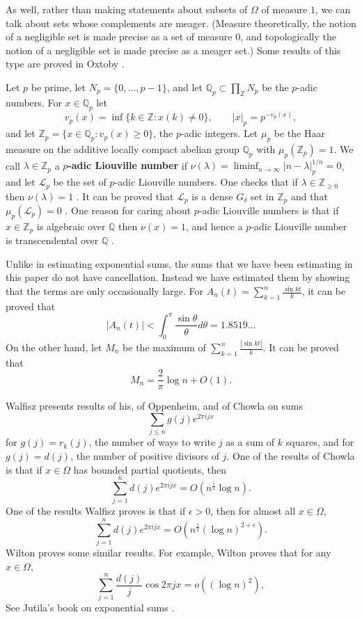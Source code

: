 \documentclass{amsart}
\begin{document}
As well, rather than making statements about subsets of $\Omega$ of measure $1$, we can talk about sets whose complements are meager. (Measure theoretically,
the notion of a negligible set is made precise as a set of measure $0$, and topologically the notion of a negligible set is made precise as a meager set.)
Some results of this type are proved in Oxtoby \cite[Chapter 2]{oxtoby}.

Let $p$ be prime, let $N_p=\{0,\ldots,p-1\}$, and let $\mathbb{Q}_p \subset \prod_{\mathbb{Z}} N_p$ be the $p$-adic numbers. For $x \in \mathbb{Q}_p$
let
\[
v_p(x) = \inf\{k \in \mathbb{Z}: x(k) \neq 0\},\qquad |x|_p = p^{-v_p(x)},
\]
and let $\mathbb{Z}_p = \{x \in \mathbb{Q}_p: v_p(x) \geq 0\}$, the $p$-adic integers. 
Let $\mu_p$ be the Haar measure on the additive locally compact abelian group $\mathbb{Q}_p$ with
$\mu_p(\mathbb{Z}_p)=1$. 
We call $\lambda \in \mathbb{Z}_p$ a \textbf{$p$-adic Liouville number} if $\nu(\lambda)=\liminf_{n \to \infty} |n-\lambda|_p^{1/n}=0$, and let
$\mathscr{L}_p$ be the set of $p$-adic Liouville numbers. One checks that if $\lambda \in \mathbb{Z}_{\geq 0}$ then
$\nu(\lambda)=1$  \cite[p.~201, Exercise 66.A]{schikhof}.
It can be proved that $\mathscr{L}_p$ is a dense $G_\delta$ set in $\mathbb{Z}_p$ \cite[p.~204,
Theorem 67.3]{schikhof} and that
$\mu_p(\mathscr{L}_p)=0$ \cite[p.~205, Theorem 67.4]{schikhof}.
One reason for caring about $p$-adic Liouville numbers is that
if $x \in \mathbb{Z}_p$ is algebraic over $\mathbb{Q}$ then $\nu(x)=1$, and hence
a $p$-adic Liouville number is transcendental over $\mathbb{Q}$ \cite[p.~203, Theorem 67.2]{schikhof}.



Unlike in estimating exponential sums, the sums that we have been estimating
in this paper do not have cancellation. Instead we have estimated
them by showing that the terms are only occasionally large. 
For $A_n(t)=\sum_{k=1}^n \frac{\sin kt}{k}$, it can be proved \cite[p.~74, no.~25]{polyaII} that
\[
|A_n(t)| < \int_0^\pi \frac{\sin \theta}{\theta} d\theta=1.8519\ldots
\]
On the other hand, let $M_n$ be the maximum of $\sum_{k=1}^n \frac{|\sin kt|}{k}$. It can be proved \cite[p.~77, no.~38]{polyaII} that
\[
M_n=\frac{2}{\pi}\log n +O(1).
\]

Walfisz \cite{walfisz} presents results of his, of Oppenheim, and of Chowla  on sums
\[
\sum_{j \leq n} g(j) e^{2\pi i jx}
\]
 for $g(j)=r_k(j)$, the number of ways to write
$j$ as a sum of $k$ squares,  and for $g(j)=d(j)$, the number of positive divisors of $j$. One of the results of Chowla is that  if $x \in \Omega$ has bounded
partial quotients, then
\[
\sum_{j=1}^n d(j) e^{2\pi i jx}=O\left(n^{\frac{1}{2}} \log n \right).
\]
One of the results Walfisz proves is that if $\epsilon>0$, then for almost all $x \in \Omega$,
\[
\sum_{j=1}^n d(j) e^{2\pi ijx}= O\left( n^{\frac{1}{2}} (\log n)^{2+\epsilon} \right).
\]
Wilton \cite{wilton} proves some similar results. For example, Wilton proves that for any $x \in \Omega$, 
\[
\sum_{j=1}^n \frac{d(j)}{j} \cos 2\pi jx = o((\log n)^2),
\]
See Jutila's book on exponential sums \cite{jutila}. 
\end{document}
